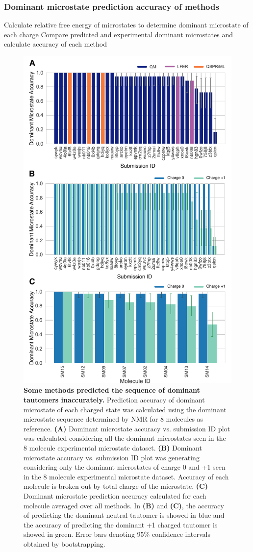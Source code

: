 \documentclass[9pt,lineno,final]{elife}
\begin{document}
\subsubsection{Dominant microstate prediction accuracy of methods}

Calculate relative free energy of microstates to determine dominant microstate of each charge
Compare predicted and experimental dominant microstates and calculate accuracy of each method



\begin{figure}
\centering
\includegraphics[width=0.5\linewidth]{figures/typeI_dominant_microstate_accuracy.pdf}
\caption{{\bf Some methods predicted the sequence of dominant tautomers inaccurately.} Prediction accuracy of dominant microstate of each charged state was calculated using the dominant microstate sequence determined by NMR for 8 molecules as reference. 
{\bf(A)} Dominant microstate accuracy vs. submission ID plot was calculated considering all the dominant microstates seen in the 8 molecule experimental microstate dataset. {\bf(B)} Dominant microstate accuracy vs. submission ID plot was generating considering only the dominant microstates of charge 0 and +1 seen in the 8 molecule experimental microstate dataset. Accuracy of each molecule is broken out by total charge of the microstate. {\bf(C)} Dominant microstate prediction accuracy calculated for each molecule averaged over all methods. In {\bf(B)} and {\bf(C)}, the accuracy of predicting the dominant neutral tautomer is showed in blue and the accuracy of predicting the dominant +1 charged tautomer is showed in green. Error bars denoting 95\% confidence intervals obtained by bootstrapping.
}
\label{fig:typeI_dominant_microstate_accuracy}
\end{figure}
\end{document}
